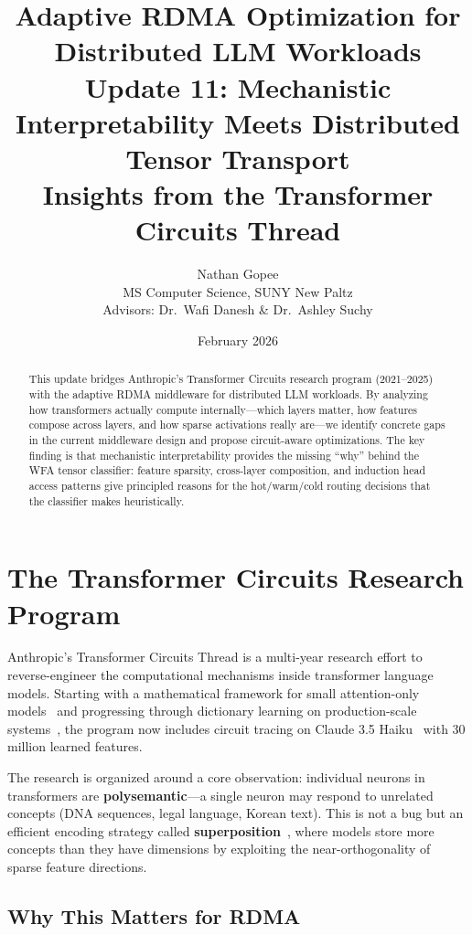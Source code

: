 \documentclass[11pt,letterpaper]{article}
\title{\textbf{Adaptive RDMA Optimization for Distributed LLM Workloads}\\[0.5em]
\large Update 11: Mechanistic Interpretability Meets Distributed Tensor Transport\\[0.3em]
\normalsize Insights from the Transformer Circuits Thread}
\author{Nathan Gopee\\
MS Computer Science, SUNY New Paltz\\
Advisors: Dr.\ Wafi Danesh \& Dr.\ Ashley Suchy}
\date{February 2026}
\begin{document}
\maketitle

\begin{abstract}
\noindent
This update bridges Anthropic's Transformer Circuits research program (2021--2025) with the adaptive RDMA middleware for distributed LLM workloads. By analyzing how transformers actually compute internally---which layers matter, how features compose across layers, and how sparse activations really are---we identify concrete gaps in the current middleware design and propose circuit-aware optimizations. The key finding is that mechanistic interpretability provides the missing ``why'' behind the WFA tensor classifier: feature sparsity, cross-layer composition, and induction head access patterns give principled reasons for the hot/warm/cold routing decisions that the classifier makes heuristically.
\end{abstract}

\tableofcontents
\newpage

\section{The Transformer Circuits Research Program}
\label{sec:circuits-overview}

Anthropic's Transformer Circuits Thread is a multi-year research effort to reverse-engineer the computational mechanisms inside transformer language models. Starting with a mathematical framework for small attention-only models~\cite{elhage2021framework} and progressing through dictionary learning on production-scale systems~\cite{templeton2024scaling}, the program now includes circuit tracing on Claude 3.5 Haiku~\cite{lindsey2025biology} with 30 million learned features.

The research is organized around a core observation: individual neurons in transformers are \textbf{polysemantic}---a single neuron may respond to unrelated concepts (DNA sequences, legal language, Korean text). This is not a bug but an efficient encoding strategy called \textbf{superposition}~\cite{elhage2022superposition}, where models store more concepts than they have dimensions by exploiting the near-orthogonality of sparse feature directions.

\subsection{Why This Matters for RDMA}
\end{document}

